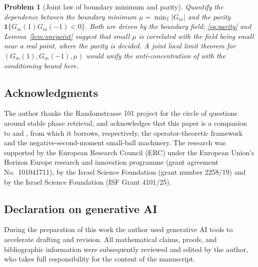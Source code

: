\documentclass[11pt]{amsart}
\numberwithin{equation}{section}
\newtheorem{problem}[theorem]{Problem}
\theoremstyle{definition}
\theoremstyle{remark}
\newcommand{\T}{\mathbb T}
\newcommand{\abs}[1]{\left\lvert #1\right\rvert}
\begin{document}
\begin{problem}[Joint law of boundary minimum and parity]\label{prob:joint}
Quantify the dependence between the boundary minimum $\mu=\min_\T\abs{G_m}$ and the parity $\mathbf1\{G_m(1)G_m(-1)<0\}$. Both are driven by the boundary field; \eqref{eq:parity} and Lemma~\ref{lem:onepoint} suggest that small $\mu$ is correlated with the field being small near a real point, where the parity is decided. A joint local limit theorem for $(G_m(1),G_m(-1),\mu)$ would unify the anti-concentration of \cite{Parity} with the conditioning bound here.
\end{problem}

\subsection*{Acknowledgments}
The author thanks the Randomstrasse 101 project for the circle of questions around stable phase retrieval, and acknowledges that this paper is a companion to \cite{Parity} and \cite{PhaseRetrieval}, from which it borrows, respectively, the operator-theoretic framework and the negative-second-moment small-ball machinery. The research was supported by the European Research Council (ERC) under the European Union's Horizon Europe research and innovation programme (grant agreement No.\ 101041711), by the Israel Science Foundation (grant number 2258/19) and by the Israel Science Foundation (ISF Grant 4101/25).

\subsection*{Declaration on generative AI}
During the preparation of this work the author used generative AI tools to accelerate drafting and revision. All mathematical claims, proofs, and bibliographic information were subsequently reviewed and edited by the author, who takes full responsibility for the content of the manuscript.
\end{document}
